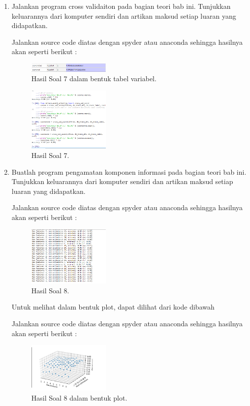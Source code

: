 \begin{enumerate}
    \item Jalankan program cross validaiton pada bagian teori bab ini. Tunjukkan keluarannya dari komputer sendiri dan artikan maksud setiap luaran yang didapatkan.
	\hfill\break
    
	Jalankan source code diatas dengan spyder atau anaconda sehingga hasilnya akan seperti berikut : 
	\begin{figure}[H]
	\centering
		\includegraphics[width=4cm]{figures/1174096/tugas4/hasil7.1.PNG}
		\caption{Hasil Soal 7 dalam bentuk tabel variabel.}
	\end{figure}
    \begin{figure}[H]
	\centering
		\includegraphics[width=4cm]{figures/1174096/tugas4/hasil7.2.PNG}
		\caption{Hasil Soal 7.}
	\end{figure}


    \item Buatlah program pengamatan komponen informasi pada bagian teori bab ini. Tunjukkan keluarannya dari komputer sendiri dan artikan maksud setiap luaran yang didapatkan.
	\hfill\break
    
	Jalankan source code diatas dengan spyder atau anaconda sehingga hasilnya akan seperti berikut : 
	\begin{figure}[H]
	\centering
		\includegraphics[width=4cm]{figures/1174096/tugas4/hasil8.1.PNG}
		\caption{Hasil Soal 8.}
	\end{figure}
    Untuk melihat dalam bentuk plot, dapat dilihat dari kode dibawah
    
	Jalankan source code diatas dengan spyder atau anaconda sehingga hasilnya akan seperti berikut : 
    \begin{figure}[H]
	\centering
		\includegraphics[width=4cm]{figures/1174096/tugas4/hasil8.2.PNG}
		\caption{Hasil Soal 8 dalam bentuk plot.}
	\end{figure}
\end{enumerate}

